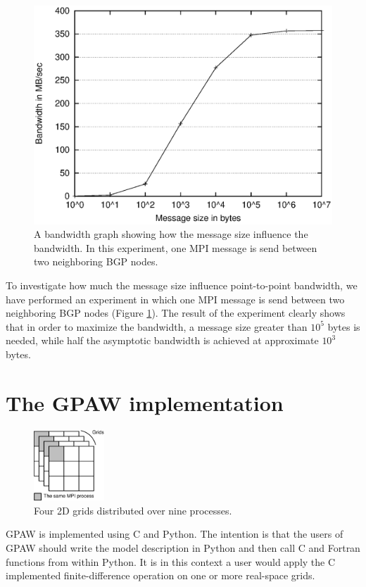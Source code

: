 \documentclass[preprint,3p,times,twocolumn]{elsarticle}
\begin{document}
\begin{figure}
 \centering
 \includegraphics[width=\linewidth]{gfx/bgp_batchsize}
 \caption{A bandwidth graph showing how the message size influence the bandwidth. In this experiment, one MPI message is send between two neighboring BGP nodes.}
 \label{fig:batchsize}
\end{figure}

To investigate how much the message size influence point-to-point bandwidth, we have performed an experiment in which one MPI message is send between two neighboring BGP nodes (Figure \ref{fig:batchsize}). The result of the experiment clearly shows that in order to maximize the bandwidth, a message size greater than $10^5$ bytes is needed, while half the asymptotic bandwidth is achieved at approximate $10^3$ bytes.


\section{The GPAW implementation}\label{section:GPAW_impl}
\begin{figure}
 \centering
 \includegraphics[width=100px]{gfx/wavedist}
 \caption{Four 2D grids distributed over nine processes.}
 \label{fig:wavedist}
\end{figure}

GPAW is implemented using C and Python. The intention is that the users of GPAW should write the model description in Python and then call C and Fortran functions from within Python. It is in this context a user would apply the C implemented finite-difference operation on one or more real-space grids.
\end{document}
